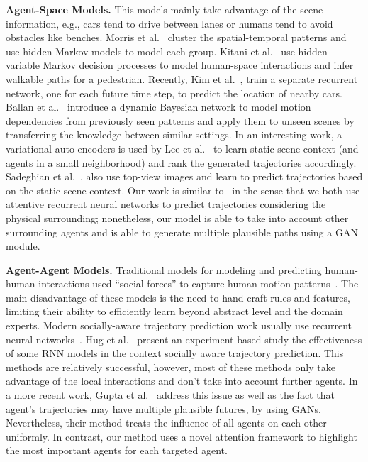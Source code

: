 \documentclass[10pt,twocolumn,letterpaper]{article}
\begin{document}
\textbf{Agent-Space Models.} This models mainly take advantage of the scene information, e.g., cars tend to drive between lanes or humans tend to avoid obstacles like benches.
Morris et al.~\cite{morris2011trajectory} cluster the spatial-temporal patterns and use hidden Markov models to model each group. Kitani et al.~\cite{kitani2012activity} use hidden variable Markov decision processes to model human-space interactions and infer walkable paths for a pedestrian. Recently, Kim et al.~\cite{kim2017probabilistic}, train a separate recurrent network, one for each future time step, to predict the location of nearby cars. 
Ballan et al.~\cite{ballan2016knowledge} introduce a dynamic Bayesian network to model motion dependencies from previously seen patterns and apply them to unseen scenes by transferring the knowledge between similar settings. 
In an interesting work,  a variational auto-encoders is used by Lee et al.~\cite{lee2017desire} to learn static scene context (and agents in a small neighborhood) and rank the generated trajectories accordingly.
Sadeghian et al.~\cite{sadeghian2017car}, also use top-view images and learn to predict trajectories based on the static scene context. Our work is similar to~\cite{sadeghian2017car} in the sense that we both use attentive recurrent neural networks to predict trajectories considering the physical surrounding; nonetheless, our model is able to take into account other surrounding agents and is able to generate multiple plausible paths using a GAN module.




\textbf{Agent-Agent Models.} Traditional models for modeling and predicting human-human interactions used ``social forces'' to capture human motion patterns~\cite{helbing1995social,mehran2009abnormal,yamaguchi2011you,pellegrini2010improving,alahi2014socially,robicquet2016learning}. The main disadvantage of these models is the need to hand-craft rules and features, limiting their ability to efficiently learn beyond abstract level and the domain experts. Modern socially-aware trajectory prediction work usually use recurrent neural networks~\cite{alahi2016social,lee2017desire,fernando2017soft+,fernando2017tree,bartoli2017context,hug2018particle}. Hug et al.~\cite{hug2017reliability} present an experiment-based study the effectiveness of some RNN models in the context socially aware trajectory prediction. This methods are relatively successful, however, most of these methods only take advantage of the local interactions and don't take into account further agents. In a more recent work, Gupta et al.~\cite{gupta2018social} address this issue as well as the fact that agent's trajectories may have multiple plausible futures, by using GANs. Nevertheless, their method treats the influence of all agents on each other uniformly. In contrast, our method uses a novel attention framework to highlight the most important agents for each targeted agent.
\end{document}
